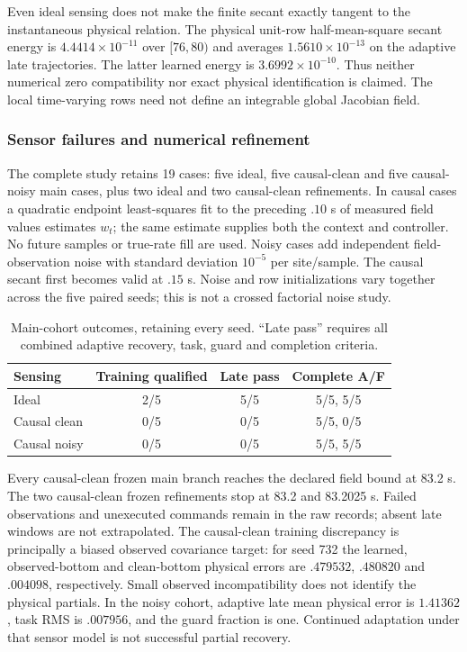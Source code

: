 Even ideal sensing does not make the finite secant exactly tangent to the
instantaneous physical relation. The physical unit-row half-mean-square
secant energy is $4.4414\times10^{-11}$ over $[76,80)$ and averages
$1.5610\times10^{-13}$ on the adaptive late trajectories. The latter learned
energy is $3.6992\times10^{-10}$. Thus neither numerical zero compatibility
nor exact physical identification is claimed. The local time-varying rows
need not define an integrable global Jacobian field.

\subsubsection{Sensor failures and numerical refinement}
The complete study retains 19 cases: five ideal, five causal-clean and five
causal-noisy main cases, plus two ideal and two causal-clean refinements.
In causal cases a quadratic endpoint least-squares fit to the preceding $.10$
s of measured field values estimates $w_t$; the same estimate supplies both the
context and controller. No future samples or true-rate fill are used. Noisy
cases add independent field-observation noise with standard deviation $10^{-5}$ per
site/sample. The causal secant first becomes valid at $.15$ s. Noise and row
initializations vary together across the five paired seeds; this is not a
crossed factorial noise study.

\begin{table}[t]
\centering
\caption{Main-cohort outcomes, retaining every seed. ``Late pass'' requires
all combined adaptive recovery, task, guard and completion criteria.}
\label{tab:direct_burgers_conditions}
\renewcommand{\arraystretch}{1.15}
\begin{tabular}{lccc}
\hline
Sensing & Training qualified & Late pass & Complete A/F\\
\hline
Ideal & 2/5 & 5/5 & 5/5, 5/5\\
Causal clean & 0/5 & 0/5 & 5/5, 0/5\\
Causal noisy & 0/5 & 0/5 & 5/5, 5/5\\
\hline
\end{tabular}
\end{table}

Every causal-clean frozen main branch reaches the declared field bound at
83.2 s. The two causal-clean frozen refinements stop at 83.2 and 83.2025 s.
Failed observations and unexecuted commands remain in the raw records; absent
late windows are not extrapolated. The causal-clean training discrepancy is
principally a biased observed covariance target: for seed 732 the learned,
observed-bottom and clean-bottom physical errors are $.479532$, $.480820$
and $.004098$, respectively. Small observed incompatibility does not identify
the physical partials. In the noisy cohort, adaptive late mean physical error
is $1.41362$, task RMS is $.007956$, and the guard fraction is one. Continued
adaptation under that sensor model is not successful partial recovery.

